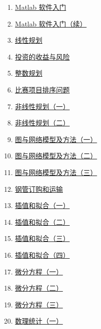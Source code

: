 \documentclass[11pt]{article}
\begin{document}
\begin{multicols}{2}
	\begin{enumerate}
		\item \href{https://mp.weixin.qq.com/s/ROwL9BqQ1E-KTJ-shX4XVQ}{Matlab 软件入门}	%
		\item \href{https://mp.weixin.qq.com/s/6k4Wci2bf5J7McDz-MyyMQ}{Matlab 软件入门（续）}	%
		\item \href{https://mp.weixin.qq.com/s/qJSks7nKWAX-ps6IUe98Jg}{线性规划}	%
		\item \href{https://mp.weixin.qq.com/s/1j8kLKBG7B6SV2BK4GblSQ}{投资的收益与风险}	%
		\item \href{https://mp.weixin.qq.com/s/oxafNX6_j666gNiIdPGeOQ}{整数规划}	%
		\item \href{https://mp.weixin.qq.com/s/6DywMB6qKLPmCctPNSxtAA}{比赛项目排序问题}	%
		\item \href{https://mp.weixin.qq.com/s/ydKCBteL0Y7boeVmfe1A8g}{非线性规划（一）}	%
		\item \href{https://mp.weixin.qq.com/s/v5UbUGla3_bHlA_3DFpxig}{非线性规划（二）}	%
		\item \href{https://mp.weixin.qq.com/s/PYKFN-fnJEOZXKzBVfSPfA}{图与网络模型及方法（一）}	%
		\item \href{https://mp.weixin.qq.com/s/gtxpv1ayhFzByEjbMBFF1Q}{图与网络模型及方法（二）}	%
		\item \href{https://mp.weixin.qq.com/s/9v5PgDNsniMtY-2bgyoXmA}{图与网络模型及方法（三）}	%
		\item \href{https://mp.weixin.qq.com/s/FhBCGQYGxBq12sDo_MkWug}{钢管订购和运输}	%
		\item \href{https://mp.weixin.qq.com/s/hmHhWaIF7Opmub1b_AEq7g}{插值和拟合（一）}	%
		\item \href{https://mp.weixin.qq.com/s/W2JNhkUB4fMFhTM1NH3Xkw}{插值和拟合（二）}	%
		\item \href{https://mp.weixin.qq.com/s/qD2BgQUhql2TQGKyJbPBiw}{插值和拟合（三）}	%
		\item \href{https://mp.weixin.qq.com/s/z6NA1czRUg5XXkUpldcd3w}{插值和拟合（四）}	%
		\item \href{https://mp.weixin.qq.com/s/SpnMUv1Xwnr12lBO5dOyww}{微分方程（一）}	%
		\item \href{https://mp.weixin.qq.com/s/VwPASD4Znk0fK_FrtJq2AA}{微分方程（二）}	%
		\item \href{https://mp.weixin.qq.com/s/WTtM584myR0sl8yXIfHnEw}{微分方程（三）}	%
		\item \href{https://mp.weixin.qq.com/s/syMh9enPg38ByNi6o81Y-A}{数理统计（一）}	%

\end{enumerate}
\end{multicols}
\end{document}
